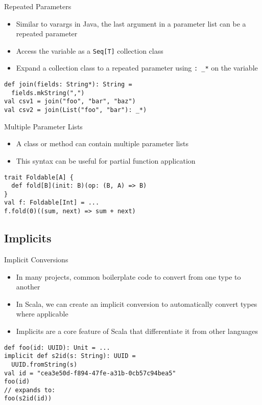 \documentclass{beamer}
\begin{document}
\begin{frame}[fragile]{Repeated Parameters}
\begin{itemize}
\item Similar to varargs in Java, the last argument in a parameter list can be a
repeated parameter
\item Access the variable as a \lstinline{Seq[T]} collection class
\item Expand a collection class to a repeated parameter using \lstinline{: _*} on the variable
\end{itemize}
\begin{lstlisting}
def join(fields: String*): String =
  fields.mkString(",")
val csv1 = join("foo", "bar", "baz")
val csv2 = join(List("foo", "bar"): _*)
\end{lstlisting}
\end{frame}

\begin{frame}[fragile]{Multiple Parameter Lists}
\begin{itemize}
\item A class or method can contain multiple parameter lists
\item This syntax can be useful for partial function application
\end{itemize}
\begin{lstlisting}
trait Foldable[A] {
  def fold[B](init: B)(op: (B, A) => B)
}
val f: Foldable[Int] = ...
f.fold(0)((sum, next) => sum + next)
\end{lstlisting}
\end{frame}


\subsection{Implicits}

\begin{frame}[fragile]{Implicit Conversions}
\begin{itemize}
\item In many projects, common boilerplate code to convert from one type to another
\item In Scala, we can create an implicit conversion to automatically convert types
where applicable
\item Implicits are a core feature of Scala that differentiate it from other languages
\end{itemize}
\begin{lstlisting}
def foo(id: UUID): Unit = ...
implicit def s2id(s: String): UUID =
  UUID.fromString(s)
val id = "cea3e50d-f894-47fe-a31b-0cb57c94bea5"
foo(id)
// expands to:
foo(s2id(id))
\end{lstlisting}
\end{frame}
\end{document}
